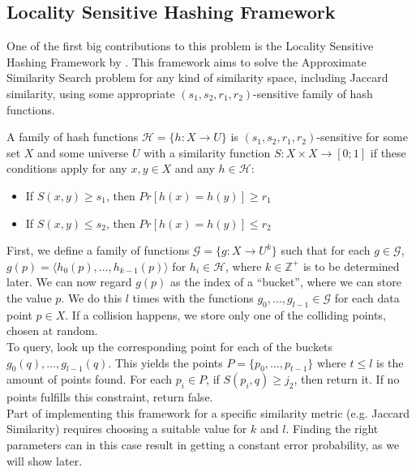 \subsection{Locality Sensitive Hashing Framework}
One of the first big contributions to this problem is the Locality Sensitive Hashing Framework by \citet{Indyk1998ApproximateNN}. This framework aims to solve the Approximate Similarity Search problem for any kind of similarity space, including Jaccard similarity, using some appropriate $(s_1, s_2, r_1, r_2)$-sensitive family of hash functions.
\begin{definition}
\label{thm:sensitive-hash}
A family of hash functions $\mathcal{H}=\{h\colon X\rightarrow U\}$ is $(s_1, s_2, r_1, r_2)$-sensitive for some set $X$ and some universe $U$ with a similarity function $S\colon X\times X \rightarrow [0;1]$ if these conditions apply for any $x,y \in X$ and any $h \in \mathcal{H}$:
\begin{itemize}
    \item If $S(x,y) \geq s_1$, then $Pr[h(x)=h(y)] \geq r_1$
    \item If $S(x,y) \leq s_2$, then $Pr[h(x)=h(y)] \leq r_2$
\end{itemize}
\end{definition}
First, we define a family of functions $\mathcal{G}=\{g\colon X \rightarrow U^k \}$ such that for each $g\in \mathcal{G}$, $g(p)=\langle h_0(p), \dots, h_{k-1}(p)\rangle$ for $h_i\in \mathcal{H}$, where $k\in \mathbb{Z}^+$ is to be determined later. We can now regard $g(p)$ as the index of a ``bucket'', where we can store the value $p$. We do this $l$ times with the functions $g_0, \dots, g_{l-1} \in \mathcal{G}$ for each data point $p\in X$. If a collision happens, we store only one of the colliding points, chosen at random.\\
To query, look up the corresponding point for each of the buckets $g_0(q), \dots, g_{l-1}(q)$. This yields the points $P=\{p_0, \dots, p_{t-1}\}$ where $t\leq l$ is the amount of points found. For each $p_i \in P$, if $S(p_i, q) \geq j_2$, then return it. If no points fulfills this constraint, return false.\\
Part of implementing this framework for a specific similarity metric (e.g. Jaccard Similarity) requires choosing a suitable value for $k$ and $l$. Finding the right parameters can in this case result in getting a constant error probability, as we will show later.
